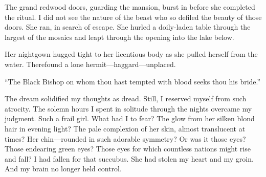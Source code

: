 \documentclass{article}
\begin{document}
\VV


\noindent %
The grand redwood doors, guarding the mansion, burst in
before she completed the ritual.
I did not see the nature of the beast who so defiled the
beauty of those doors.
She ran, in search of escape.
She hurled a doily-laden table through the largest
of the mosaics and leapt through the opening
into the lake below.


Her nightgown hugged tight to her licentious body
as she pulled herself from the water.
Therefound a lone hermit---haggard---unplaced.


``The Black Bishop on whom thou hast tempted
with blood seeks thou his bride.''
\vvvv


\noindent
The dream
solidified my thoughts as dread.
Still, I reserved myself from such atrocity.
The solemn hours I spent in solitude through the nights
overcame my judgment.
Such a frail girl.
What had I to fear?
The glow from her silken blond hair in evening light?
The pale complexion of her skin, almost translucent at times?
Her chin---rounded in such adorable symmetry?
Or was it those eyes? Those endearing green eyes?
Those eyes for which countless nations might rise and fall?
I had fallen for that succubus.
She had stolen my heart and my groin.
And my brain no longer held control.
\VV
\end{document}

